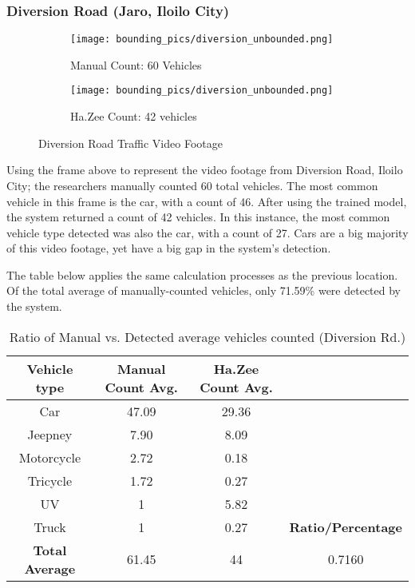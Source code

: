 \subsubsection{Diversion Road (Jaro, Iloilo City)
}


\begin{figure}
	\begin{subfigure}{.5\textwidth}
		\centering
		\texttt{[image: bounding\_pics/diversion\_unbounded.png]}
		\caption{Manual Count: 60 Vehicles}
		
	\end{subfigure}%
	\begin{subfigure}{.5\textwidth}
		\centering
		\texttt{[image: bounding\_pics/diversion\_unbounded.png]}
		\caption{Ha.Zee Count: 42 vehicles}
	\end{subfigure}
	\caption{Diversion Road Traffic Video Footage}
\end{figure}
Using the frame above to represent the video footage from Diversion Road, Iloilo City; the researchers manually counted 60 total vehicles. The most common vehicle in this frame is the car, with a count of 46. After using the trained model, the system returned a count of 42 vehicles. In this instance, the most common vehicle type detected was also the car, with a count of 27. Cars are a big majority of this video footage, yet have a big gap in the system’s detection.

The table below applies the same calculation processes as the previous location. Of the total average of manually-counted vehicles, only 71.59\% were detected by the system. 




\begin{table}[ht]   %
	\centering
	\caption{Ratio of Manual vs. Detected average vehicles counted  (Diversion Rd.)} \vspace{0.25em}
	\begin{tabular}{|c|c|c|c|} \hline
		\centering \textbf {Vehicle type} & Manual Count Avg. & Ha.Zee Count Avg.	&  \\ \hline
		Car & 47.09 & 29.36  &   \\ \hline
		Jeepney & 7.90 & 8.09  &	\\ \hline
		Motorcycle& 2.72  & 0.18  & \\ \hline
		Tricycle   & 1.72  & 0.27 & \\ \hline
		UV & 1 & 5.82 & \\ \hline
		Truck & 1 & 0.27 & \textbf{Ratio/Percentage}\\ \hline
		
		\textbf{Total Average} & 61.45 & 44 & 0.7160 \\ \hline
		
	\end{tabular}
	\label{tab:diversion_rd}
\end{table}




